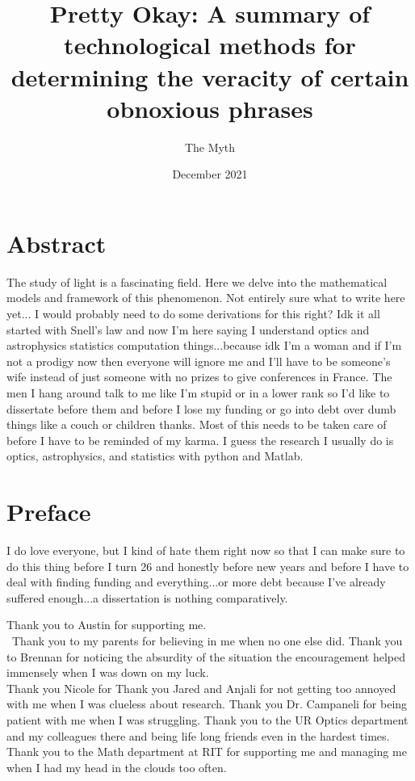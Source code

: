 \documentclass{dcthesis}
\title{Pretty Okay: A summary of technological methods for determining the veracity of certain obnoxious phrases}
\author{The Myth}
\date{December 2021}
\theoremstyle{definition}
\theoremstyle{remark}
\begin{document}
\frontmatter

\maketitle
\restoregeometry

\chapter*{Abstract}
The study of light is a fascinating field. Here we delve into the mathematical models and framework of this phenomenon. Not entirely sure what to write here yet... I would probably need to do some derivations for this right? Idk it all started with Snell's law and now I'm here saying I understand optics and astrophysics statistics computation things...because idk I'm a woman and if I'm not a prodigy now then everyone will ignore me and I'll have to be someone's wife instead of just someone with no prizes to give conferences in France. The men I hang around talk to me like I'm stupid or in a lower rank so I'd like to dissertate before them and before I lose my funding or go into debt over dumb things like a couch or children thanks. Most of this needs to be taken care of before I have to be reminded of my karma. I guess the research I usually do is optics, astrophysics, and statistics with python and Matlab. 

\chapter*{Preface}
I do love everyone, but I kind of hate them right now so that I can make sure to do this thing before I turn 26 and honestly before new years and before I have to deal with finding funding and everything...or more debt because I've already suffered enough...a dissertation is nothing comparatively.  

Thank you to Austin for supporting me. \\\
Thank you to my parents for believing in me when no one else did. Thank you to Brennan for noticing the absurdity of the situation the encouragement helped immensely when I was down on my luck. \\ Thank you Nicole for 
Thank you Jared and Anjali for not getting too annoyed with me when I was clueless about research. 
Thank you Dr. Campaneli for being patient with me when I was struggling. 
Thank you to the UR Optics department and my colleagues there and being life long friends even in the hardest times. \\ 
Thank you to the Math department at RIT for supporting me and managing me when I had my head in the clouds too often. 
\end{document}
